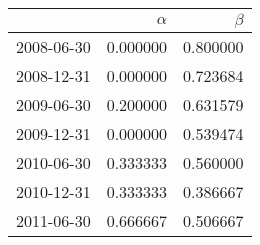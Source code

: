 \begin{tabular}{lrr}
\toprule
{} &     $\alpha$ &      $\beta$ \\
\midrule
2008-06-30 &  0.000000 &  0.800000 \\
2008-12-31 &  0.000000 &  0.723684 \\
2009-06-30 &  0.200000 &  0.631579 \\
2009-12-31 &  0.000000 &  0.539474 \\
2010-06-30 &  0.333333 &  0.560000 \\
2010-12-31 &  0.333333 &  0.386667 \\
2011-06-30 &  0.666667 &  0.506667 \\
\bottomrule
\end{tabular}
